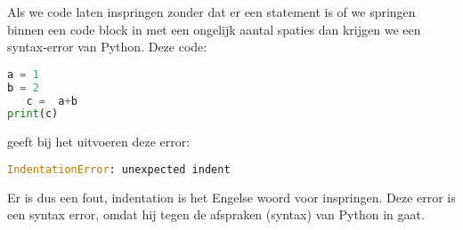 Als we code laten inspringen zonder dat er een statement is of we springen binnen een code block in met een ongelijk aantal spaties dan krijgen we een syntax-error van Python. Deze code:
\begin{lstlisting}[language=python]
a = 1
b = 2
   c =  a+b
print(c)
\end{lstlisting}
geeft bij het uitvoeren deze error:
\begin{lstlisting}[language=python]
IndentationError: unexpected indent
\end{lstlisting}
Er is dus een  fout, indentation is het Engelse woord voor inspringen. Deze error is een syntax error, omdat hij tegen de afspraken (syntax) van Python in gaat.

